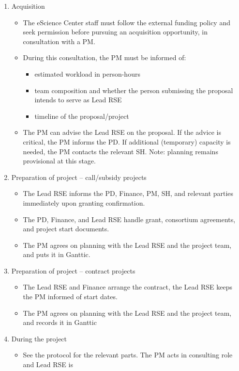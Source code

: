 \begin{enumerate}[label=\arabic*.,ref=\arabic*]
\item Acquisition
\begin{itemize}
\item The eScience Center staff must follow the external funding policy and seek permission before pursuing an acquisition opportunity, in consultation with a PM.
\item During this consultation, the PM  must be informed of:
\begin{itemize}
\item estimated workload in person-hours
\item team composition and whether the person submissing the proposal  intends to serve as Lead RSE
\item timeline of the proposal/project
\end{itemize}
\item The PM can advise the Lead RSE on the proposal. If the advice is critical, the PM informs the PD. 
If additional (temporary) capacity is needed, the PM contacts the relevant SH. 
Note: planning remains provisional at this stage.
\end{itemize}
\item Preparation of project – call/subsidy projects
\begin{itemize}
\item The Lead RSE informs the PD, Finance, PM, SH, and relevant parties immediately upon granting confirmation.
\item The PD, Finance, and Lead RSE handle grant, consortium agreements, and project start documents.
\item The PM agrees on planning with the Lead RSE and the project team, and puts it in Ganttic.
\end{itemize}
\item Preparation of project – contract projects
\begin{itemize}
\item The Lead RSE and Finance arrange the contract, the Lead RSE keeps the PM informed of start dates.
\item The PM agrees on planning with the Lead RSE and the project team, and records it in Ganttic
\end{itemize}
\item During the project
\begin{itemize}
\item See the protocol for the relevant parts. The PM acts in consulting role and Lead RSE is

\end{itemize}
\end{enumerate}
